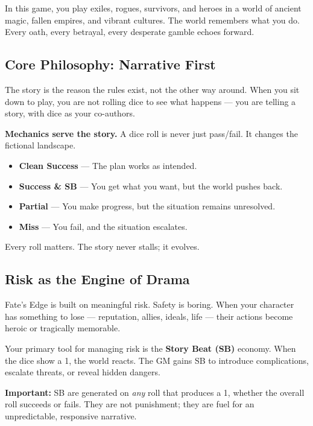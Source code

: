 \documentclass[11pt]{book}
\begin{document}
In this game, you play exiles, rogues, survivors, and heroes in a world of ancient magic, fallen empires, and vibrant cultures. The world remembers what you do. Every oath, every betrayal, every desperate gamble echoes forward.

\subsection*{Core Philosophy: Narrative First}
The story is the reason the rules exist, not the other way around. When you sit down to play, you are not rolling dice to see what happens --- you are telling a story, with dice as your co-authors.

\textbf{Mechanics serve the story.} A dice roll is never just pass/fail. It changes the fictional landscape.

\begin{itemize}
  \item \textbf{Clean Success} --- The plan works as intended.
  \item \textbf{Success \& SB} --- You get what you want, but the world pushes back.
  \item \textbf{Partial} --- You make progress, but the situation remains unresolved.
  \item \textbf{Miss} --- You fail, and the situation escalates.
\end{itemize}

Every roll matters. The story never stalls; it evolves.

\subsection*{Risk as the Engine of Drama}

Fate's Edge is built on meaningful risk. Safety is boring. When your character has something to lose --- reputation, allies, ideals, life --- their actions become heroic or tragically memorable.

Your primary tool for managing risk is the \textbf{Story Beat (SB)} economy. When the dice show a 1, the world reacts. The GM gains SB to introduce complications, escalate threats, or reveal hidden dangers.

\begin{warningbox}
\textbf{Important:} SB are generated on \emph{any} roll that produces a 1, whether the overall roll succeeds or fails. They are not punishment; they are fuel for an unpredictable, responsive narrative.
\end{warningbox}
\end{document}
